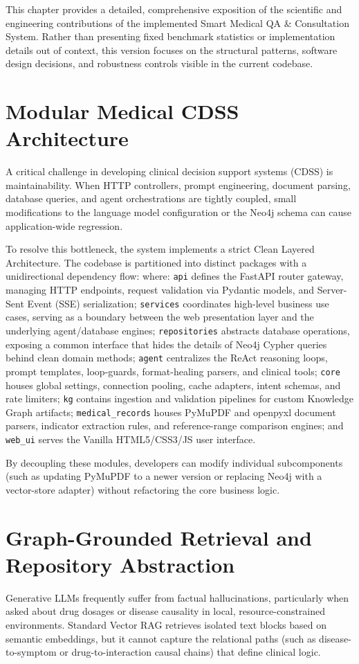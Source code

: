 \documentclass[../main.tex]{subfiles}
\begin{document}
This chapter provides a detailed, comprehensive exposition of the scientific and engineering contributions of the implemented Smart Medical QA \& Consultation System. Rather than presenting fixed benchmark statistics or implementation details out of context, this version focuses on the structural patterns, software design decisions, and robustness controls visible in the current codebase.

\section{Modular Medical CDSS Architecture}
A critical challenge in developing clinical decision support systems (CDSS) is maintainability. When HTTP controllers, prompt engineering, document parsing, database queries, and agent orchestrations are tightly coupled, small modifications to the language model configuration or the Neo4j schema can cause application-wide regression.

To resolve this bottleneck, the system implements a strict Clean Layered Architecture. The codebase is partitioned into distinct packages with a unidirectional dependency flow:
where: \texttt{api} defines the FastAPI router gateway, managing HTTP endpoints, request validation via Pydantic models, and Server-Sent Event (SSE) serialization; \texttt{services} coordinates high-level business use cases, serving as a boundary between the web presentation layer and the underlying agent/database engines; \texttt{repositories} abstracts database operations, exposing a common interface that hides the details of Neo4j Cypher queries behind clean domain methods; \texttt{agent} centralizes the ReAct reasoning loops, prompt templates, loop-guards, format-healing parsers, and clinical tools; \texttt{core} houses global settings, connection pooling, cache adapters, intent schemas, and rate limiters; \texttt{kg} contains ingestion and validation pipelines for custom Knowledge Graph artifacts; \texttt{medical\_records} houses PyMuPDF and openpyxl document parsers, indicator extraction rules, and reference-range comparison engines; and \texttt{web\_ui} serves the Vanilla HTML5/CSS3/JS user interface.

By decoupling these modules, developers can modify individual subcomponents (such as updating PyMuPDF to a newer version or replacing Neo4j with a vector-store adapter) without refactoring the core business logic.

\section{Graph-Grounded Retrieval and Repository Abstraction}
Generative LLMs frequently suffer from factual hallucinations, particularly when asked about drug dosages or disease causality in local, resource-constrained environments. Standard Vector RAG retrieves isolated text blocks based on semantic embeddings, but it cannot capture the relational paths (such as disease-to-symptom or drug-to-interaction causal chains) that define clinical logic.
\end{document}
